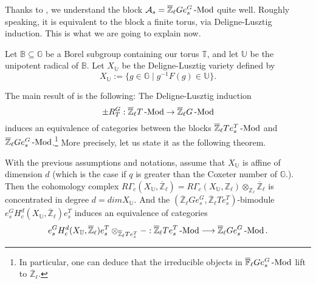 		
		
		
		Thanks to \cite{broue1990isometries}, we understand the block $\mathcal{A}_s=\overline{\mathbb{Z}}_{\ell}Ge_s^G\operatorname{-Mod}$ quite well. Roughly speaking, it is equivalent to the block a finite torus, via Deligne-Lusztig induction. This is what we are going to explain now.
		
		Let $\mathbb{B} \subseteq \mathbb{G}$ be a Borel subgroup containing our torus $\mathbb{T}$, and let $\mathbb{U}$ be the unipotent radical of $\mathbb{B}$. Let $X_{\mathbb{U}}$ be the Deligne-Lusztig variety defined by
		$$X_{\mathbb{U}}:=\{g \in \mathbb{G} \;|\; g^{-1}F(g) \in \mathbb{U}\}.$$
		
		The main result of \cite{broue1990isometries} is the following: The Deligne-Lusztig induction 
		$$\pm R_T^G: \overline{\mathbb{Z}}_{\ell}T\operatorname{-Mod} \to \overline{\mathbb{Z}}_{\ell}G\operatorname{-Mod}$$ induces an equivalence of categories between the blocks $\overline{\mathbb{Z}}_{\ell}Te_s^T\operatorname{-Mod}$ and $\overline{\mathbb{Z}}_{\ell}Ge_s^G\operatorname{-Mod}$.\footnote{In particular, one can deduce that the irreducible objects in $\overline{\mathbb{F}}_{\ell}Ge_s^G\operatorname{-Mod}$ lift to $\overline{\mathbb{Z}}_{\ell}$.} More precisely, let us state it as the following theorem.
		
		\begin{theorem}\label{Thm Broué}
			With the previous assumptions and notations, assume that $X_{\mathbb{U}}$ is affine of dimension $d$ (which is the case if $q$ is greater than the Coxeter number of $\mathbb{G}$.). Then the cohomology complex $R\Gamma_c(X_{\mathbb{U}}, \overline{\mathbb{Z}}_{\ell})=R\Gamma_c(X_{\mathbb{U}}, {\mathbb{Z}_\ell}) \otimes_{\mathbb{Z}_\ell}$$\overline{\mathbb{Z}}_{\ell}$ is concentrated in degree $d=dimX_{\mathbb{U}}$. And the $(\overline{\mathbb{Z}}_{\ell}Ge_s^G, \overline{\mathbb{Z}}_{\ell}Te_s^T)$-bimodule $e_s^GH_c^d(X_{\mathbb{U}}, \overline{\mathbb{Z}}_{\ell})e_s^T$ induces an equivalence of categories
			$$e_s^GH_c^d(X_{\mathbb{U}}, \overline{\mathbb{Z}}_{\ell})e_s^T \otimes_{\overline{\mathbb{Z}}_{\ell}Te_s^T}-: \overline{\mathbb{Z}}_{\ell}Te_s^T\operatorname{-Mod} \longrightarrow \overline{\mathbb{Z}}_{\ell}Ge_s^G\operatorname{-Mod}.$$
		\end{theorem}
		
